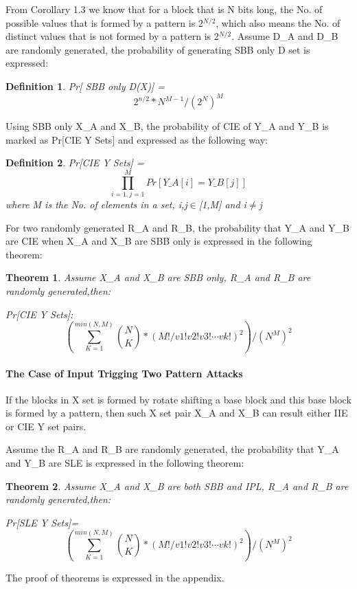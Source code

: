 \documentclass{article}
\newtheorem{theorem}{Theorem}[section]
\newtheorem{defination}{Definition}[section]
\begin{document}
From Corollary 1.3 we know that for a block that is N bits long, the No. of possible values that is formed by a pattern is 2$^{N/2}$, which also means the No. of distinct values that is not formed by a pattern is 2$^{N/2}$. Assume D\_A and D\_B are randomly generated, the probability of generating SBB only D set is expressed:
\begin{defination}
Pr[ SBB only D(X)] =
\begin{equation}
2^{n/2} * N^{M-1} / (2^N)^M
\end{equation}
\end{defination} 

Using SBB only X\_A and X\_B, the probability of CIE of Y\_A and Y\_B is marked as Pr[CIE Y Sets] and expressed as the following way:
\begin{defination}
Pr[CIE Y Sets] = $$\prod_{i=1,j=1}^M Pr[Y\_A[i] = Y\_B[j]]$$ where M is the No. of elements in a set, i,j$\in$[1,M] and i$\neq$j
\end{defination} 

For two randomly generated R\_A and R\_B, the probability that Y\_A and Y\_B are CIE when X\_A and X\_B are SBB only is expressed in the following theorem:
\begin{theorem}
Assume X\_A and X\_B are SBB only, R\_A and R\_B are randomly generated,then:

Pr[CIE Y Sets]:
\begin{displaymath}
(\sum_{K=1}^{min(N,M)} \binom{N}{K} * (M!/v1!v2!v3! \cdots vk!) ^ 2 )/(N^M)^2
\end{displaymath}
\label{set-prob}
\end{theorem}

\paragraph{The Case of Input Trigging Two Pattern Attacks}
If the blocks in X set is formed by rotate shifting a base block and this base block is formed by a pattern, then such X set pair X\_A and X\_B can result either IIE or CIE Y set pairs.

Assume the R\_A and R\_B are randomly generated, the probability that Y\_A and Y\_B are SLE is expressed in the following theorem:
\begin{theorem}
Assume X\_A and X\_B are both SBB and IPL, R\_A and R\_B are randomly generated,then:

Pr[SLE Y Sets]=
\begin{displaymath}
(\sum_{K=1}^{min(N,M)} \binom{N}{K} * (M!/v1!v2!v3! \cdots vk!) ^ 2 )/(N^M)^2
\end{displaymath}
\end{theorem}
The proof of theorems is expressed in the appendix.
\end{document}
